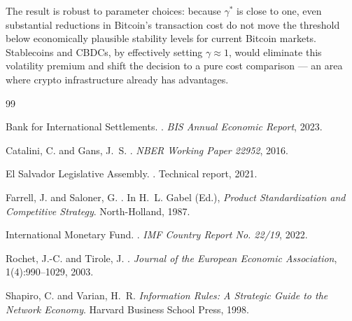 \documentclass{article}
\begin{document}
The result is robust to parameter choices: because $\gamma^*$ is close to one,
even substantial reductions in Bitcoin's transaction cost do not move the
threshold below economically plausible stability levels for current Bitcoin
markets.
Stablecoins and CBDCs, by effectively setting $\gamma \approx 1$, would
eliminate this volatility premium and shift the decision to a pure cost
comparison --- an area where crypto infrastructure already has advantages.

\begin{thebibliography}{99}

Bank for International Settlements.
.
\newblock \emph{BIS Annual Economic Report}, 2023.

Catalini, C. and Gans, J.~S.
.
\newblock \emph{NBER Working Paper 22952}, 2016.

El Salvador Legislative Assembly.
.
\newblock Technical report, 2021.

Farrell, J. and Saloner, G.
.
\newblock In H.~L. Gabel (Ed.), \emph{Product Standardization and Competitive
Strategy}. North-Holland, 1987.

International Monetary Fund.
.
\newblock \emph{IMF Country Report No. 22/19}, 2022.

Rochet, J.-C. and Tirole, J.
.
\newblock \emph{Journal of the European Economic Association}, 1(4):990--1029,
2003.

Shapiro, C. and Varian, H.~R.
\newblock \emph{Information Rules: A Strategic Guide to the Network Economy}.
\newblock Harvard Business School Press, 1998.

\end{thebibliography}
\end{document}
